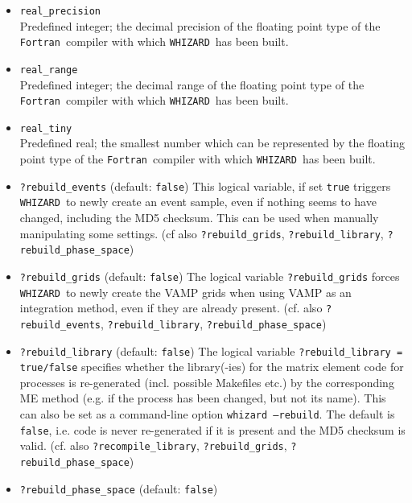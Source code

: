 \documentclass[12pt]{book}
\newcommand{\ttt}[1]{\texttt{#1}}
\newcommand{\whizard}{\texttt{WHIZARD}}
\newcommand{\fortran}{\texttt{Fortran}}
\begin{document}
\begin{itemize}
\ttt{real\_epsilon}\\
Predefined real; the relative uncertainty intrinsic to the floating
point type of the \fortran\ compiler with which \whizard\ has been
built. 
\item
\ttt{real\_precision}\\
Predefined integer; the decimal precision of the floating point type
of the \fortran\ compiler with which \whizard\ has been built.
\item
\ttt{real\_range}\\
Predefined integer; the decimal range of the floating point type of
the \fortran\ compiler with which \whizard\ has been built.
\item
\ttt{real\_tiny}\\
Predefined real; the smallest number which can be represented by the
floating point type of the \fortran\ compiler with which \whizard\ has
been built.
\item
\ttt{?rebuild\_events} \qquad (default: \ttt{false}) \newline
This logical variable, if set \ttt{true} triggers \whizard\ to newly
create an event sample, even if nothing seems to have changed,
including the MD5 checksum. This can be used when manually
manipulating some settings. (cf also \ttt{?rebuild\_grids},
\ttt{?rebuild\_library}, \ttt{?rebuild\_phase\_space}) 
\item
\ttt{?rebuild\_grids} \qquad (default: \ttt{false}) \newline
The logical variable \ttt{?rebuild\_grids} forces \whizard\ to newly
create the VAMP grids when using VAMP as an integration method, even
if they are already present. (cf. also \ttt{?rebuild\_events},
\ttt{?rebuild\_library}, \ttt{?rebuild\_phase\_space}) 
\item
\ttt{?rebuild\_library} \qquad (default: \ttt{false}) \newline
The logical variable \ttt{?rebuild\_library = true/false} specifies
whether the library(-ies) for the matrix element code for processes is
re-generated (incl. possible Makefiles etc.) by the corresponding ME
method (e.g. if the process has been changed, but not its name). This
can also be set as a command-line option \ttt{whizard --rebuild}. The
default is \ttt{false}, i.e. code is never re-generated if it is
present and the MD5 checksum is valid. 
(cf. also \ttt{?recompile\_library}, \ttt{?rebuild\_grids},
\ttt{?rebuild\_phase\_space}) 
\item
\ttt{?rebuild\_phase\_space} \qquad (default: \ttt{false}) \newline

\end{itemize}
\end{document}
